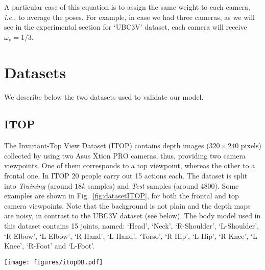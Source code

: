 \documentclass[review,12pt,3p]{elsarticle}
\def \ie{\textit{i.e.}}
\begin{document}
A particular case of this equation is to assign the same weight to each camera, \ie, to average the poses. For example, in case we had three cameras, as we will see in the experimental section for `UBC3V' dataset, each camera will receive $\omega_v = 1/3$.

\section{Datasets} \label{sec:dataset}
We describe below the two datasets used to validate our model.

\subsection{ITOP} \label{subsec:dataitop}
The Invariant-Top View Dataset (ITOP) \cite{haque2016eccv} contains %
depth images ($320\times 240$ pixels) collected by using two Asus Xtion PRO cameras, thus, providing two camera viewpoints. One of them corresponds to a top viewpoint, whereas the other to a frontal one. In ITOP 20 people carry out 15 actions each. 
The dataset is split into \textit{Training} (around $18k$ samples) and \textit{Test} samples (around 4800).
Some examples are shown in Fig.~\ref{fig:datasetITOP}, for both the frontal and top camera viewpoints. Note that the background is not plain and the depth maps are noisy, in contrast to the UBC3V dataset (see below). 
 The body model used in this dataset contains 15 joints, named: `Head', `Neck', `R-Shoulder', `L-Shoulder', `R-Elbow', `L-Elbow', `R-Hand', `L-Hand', `Torso', `R-Hip', `L-Hip', `R-Knee', `L-Knee', `R-Foot' and `L-Foot'.


\begin{figure*}[tb]
\centering
   \texttt{[image: figures/itopDB.pdf]}
   \caption{\textbf{Samples extracted from ITOP dataset}. Each block correspond to a camera viewpoint: \textit{frontal} and \textit{top}. Each block contains, from top to bottom: full-frame depth map ($320 \times 240$ pixels); pre-processed depth map (\ie~actual input for the network: $100\times 100$ pixels); and, ground-truth pose.}
   \label{fig:datasetITOP}
\end{figure*}
\end{document}
